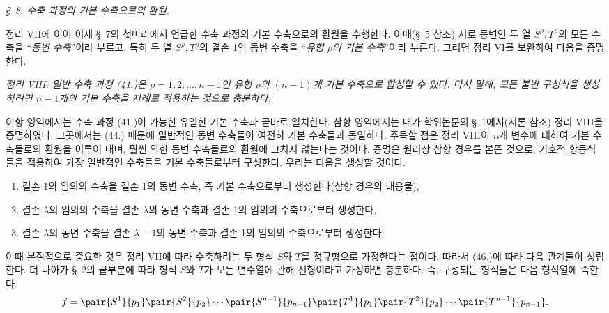 
\begin{center}
\emph{\S\ 8. 수축 과정의 기본 수축으로의 환원.}
\end{center}
정리 VII에 이어 이제 \S\ 7의 첫머리에서 언급한 수축 과정의 기본 수축으로의 환원을 수행한다. 이때(\S\ 5 참조) 서로 동변인 두 열 $S^\rho,T^\rho$의 모든 수축을 “\emph{동변 수축}”이라 부르고, 특히 두 열 $S^\rho,T^\rho$의 결손 1인 동변 수축을 “\emph{유형 $\rho$의 기본 수축}”이라 부른다. 그러면 정리 VI를 보완하여 다음을 증명한다.

\emph{정리 VIII: 일반 수축 과정 (41.)은 $\rho=1,2,\ldots,n-1$인 유형 $\rho$의 $(n-1)$개 기본 수축으로 합성할 수 있다. 다시 말해, 모든 불변 구성식을 생성하려면 $n-1$개의 기본 수축을 차례로 적용하는 것으로 충분하다.}

이항 영역에서는 수축 과정 (41.)이 가능한 유일한 기본 수축과 곧바로 일치한다. 삼항 영역에서는 내가 학위논문의 \S\ 1에서(서론 참조) 정리 VIII을 증명하였다. 그곳에서는 (44.) 때문에 일반적인 동변 수축들이 여전히 기본 수축들과 동일하다. 주목할 점은 정리 VIII이 $n$개 변수에 대하여 기본 수축들로의 환원을 이루어 내며, 훨씬 약한 동변 수축들로의 환원에 그치지 않는다는 것이다. 증명은 원리상 삼항 경우를 본뜬 것으로, 기호적 항등식들을 적용하여 가장 일반적인 수축들을 기본 수축들로부터 구성한다. 우리는 다음을 생성할 것이다.
\begin{enumerate}
\renewcommand{\labelenumi}{\arabic{enumi})}
\item 결손 1의 임의의 수축을 결손 1의 동변 수축, 즉 기본 수축으로부터 생성한다(삼항 경우의 대응물),
\item 결손 $\lambda$의 임의의 수축을 결손 $\lambda$의 동변 수축과 결손 1의 임의의 수축으로부터 생성한다,
\item 결손 $\lambda$의 동변 수축을 결손 $\lambda-1$의 동변 수축과 결손 1의 임의의 수축으로부터 생성한다.
\end{enumerate}
이때 본질적으로 중요한 것은 정리 VII에 따라 수축하려는 두 형식 $S$와 $T$를 정규형으로 가정한다는 점이다. 따라서 (46.)에 따라 다음 관계들이 성립한다.
더 나아가 \S\ 2의 끝부분에 따라 형식 $S$와 $T$가 모든 변수열에 관해 선형이라고 가정하면 충분하다. 즉, 구성되는 형식들은 다음 형식열에 속한다.
\[
 f=\pair{S^1}{p_1}\pair{S^2}{p_2}\cdots\pair{S^{n-1}}{p_{n-1}}
   \pair{T^1}{p_1}\pair{T^2}{p_2}\cdots\pair{T^{n-1}}{p_{n-1}}.
\]
